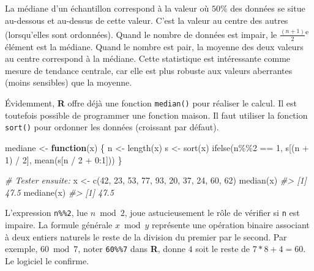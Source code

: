 \documentclass[
]{book}
\newenvironment{Shaded}{}{}
\newcommand{\CommentTok}[1]{\textit{#1}}
\newcommand{\ControlFlowTok}[1]{\textbf{#1}}
\newcommand{\DecValTok}[1]{#1}
\newcommand{\FunctionTok}[1]{#1}
\newcommand{\NormalTok}[1]{#1}
\newcommand{\OtherTok}[1]{#1}
\newcommand{\SpecialCharTok}[1]{#1}
\begin{document}
La médiane d'un échantillon correspond à la valeur où \(50\%\) des données se situe au-dessous et au-dessus de cette valeur. C'est la valeur au centre des autres (lorsqu'elles sont ordonnées). Quand le nombre de données est impair, le \(\frac{(n+1)}{2}\)\textsuperscript{e} élément est la médiane. Quand le nombre est pair, la moyenne des deux valeurs au centre correspond à la médiane. Cette statistique est intéressante comme mesure de tendance centrale, car elle est plus robuste aux valeurs aberrantes (moins sensibles) que la moyenne.

Évidemment, \textbf{R} offre déjà une fonction \texttt{median()} pour réaliser le calcul. Il est toutefois possible de programmer une fonction maison. Il faut utiliser la fonction \texttt{sort()} pour ordonner les données (croissant par défaut).

\begin{Shaded}
\begin{Highlighting}[]
\NormalTok{mediane }\OtherTok{\textless{}{-}} \ControlFlowTok{function}\NormalTok{(x) \{}
\NormalTok{  n }\OtherTok{\textless{}{-}} \FunctionTok{length}\NormalTok{(x)}
\NormalTok{  s }\OtherTok{\textless{}{-}} \FunctionTok{sort}\NormalTok{(x)}
  \FunctionTok{ifelse}\NormalTok{(n}\SpecialCharTok{\%\%}\DecValTok{2} \SpecialCharTok{==} \DecValTok{1}\NormalTok{, s[(n }\SpecialCharTok{+} \DecValTok{1}\NormalTok{) }\SpecialCharTok{/} \DecValTok{2}\NormalTok{], }\FunctionTok{mean}\NormalTok{(s[n }\SpecialCharTok{/} \DecValTok{2} \SpecialCharTok{+} \DecValTok{0}\SpecialCharTok{:}\DecValTok{1}\NormalTok{]))}
\NormalTok{\}}

\CommentTok{\# Tester ensuite:}
\NormalTok{x }\OtherTok{\textless{}{-}} \FunctionTok{c}\NormalTok{(}\DecValTok{42}\NormalTok{, }\DecValTok{23}\NormalTok{, }\DecValTok{53}\NormalTok{, }\DecValTok{77}\NormalTok{, }\DecValTok{93}\NormalTok{, }\DecValTok{20}\NormalTok{, }\DecValTok{37}\NormalTok{, }\DecValTok{24}\NormalTok{, }\DecValTok{60}\NormalTok{, }\DecValTok{62}\NormalTok{)}
\FunctionTok{median}\NormalTok{(x)}
\CommentTok{\#\textgreater{} [1] 47.5}
\FunctionTok{mediane}\NormalTok{(x)}
\CommentTok{\#\textgreater{} [1] 47.5}
\end{Highlighting}
\end{Shaded}

L'expression \texttt{n\%\%2}, lue \(n \bmod 2\), joue astucieusement le rôle de vérifier si \texttt{n} est impaire. La formule générale \(x \bmod y\) représente une opération binaire associant à deux entiers naturels le reste de la division du premier par le second. Par exemple, \(60 \bmod 7\), noter \texttt{60\%\%7} dans \textbf{R}, donne \(4\) soit le reste de \(7*8 + 4 = 60\). Le logiciel le confirme.
\end{document}

